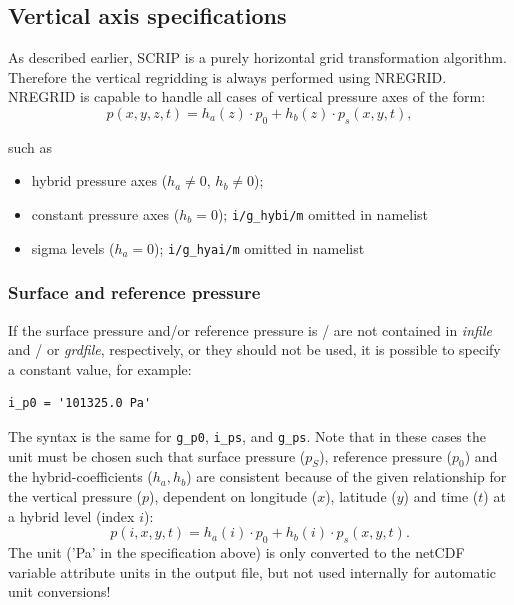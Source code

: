 \documentclass[11pt,twoside]{report}
\begin{document}
\subsection{Vertical axis specifications}
As described earlier, SCRIP is a purely horizontal grid transformation
algorithm. 
Therefore the vertical regridding is always performed using NREGRID.
NREGRID is capable to handle all cases of vertical pressure axes
of the form:
\begin{equation}
p(x, y, z, t) = h_a (z)  \cdot p_0 + h_b (z) \cdot p_s (x, y, t) ,
\end{equation}

 such as
\begin{itemize}
\item hybrid pressure axes ($h_a \neq 0$, $h_b \neq 0$);
\item constant pressure axes ($h_b = 0$); \verb|i/g_hybi/m| omitted in namelist
\item sigma levels ($h_a = 0$); \verb|i/g_hyai/m| omitted in namelist
\end{itemize}

\subsubsection{Surface and reference pressure}
If the surface pressure and/or reference pressure is / are not contained in {\it infile} and /
or {\it grdfile}, respectively, or they should not be used, it is possible to specify a constant
value, for example:
\begin{verbatim}
i_p0 = '101325.0 Pa'
\end{verbatim}
The syntax is the same for \verb|g_p0|, \verb|i_ps|, and \verb|g_ps|. 
Note that in these cases the
unit must be chosen such that surface pressure ($p_S$), 
reference pressure ($p_0$) and the hybrid-coefficients ($h_a, h_b$) are 
consistent because of the given relationship for the vertical 
pressure ($p$), dependent on longitude ($x$), latitude ($y$) and time ($t$) at
 a hybrid level (index $i$):
\begin{equation}
p(i, x, y, t) = h_a (i)  \cdot p_0 + h_b (i) \cdot p_s (x, y, t) .
\end{equation}
 The unit (’Pa’ in the specification above) is
only converted to the netCDF variable attribute units in the output file, but not
used internally for automatic unit conversions!
\end{document}
